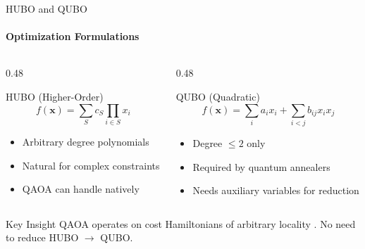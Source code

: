 \documentclass[aspectratio=169, t]{beamer}
\begin{document}
\begin{frame}{HUBO and QUBO}
\framesubtitle{Optimization Formulations}

\begin{columns}
\begin{column}{0.48\textwidth}
\begin{block}{HUBO (Higher-Order)}
$$f(\mathbf{x}) = \sum_{S} c_S \prod_{i \in S} x_i$$
\begin{itemize}
    \item Arbitrary degree polynomials
    \item Natural for complex constraints
    \item QAOA can handle natively
\end{itemize}
\end{block}
\end{column}

\begin{column}{0.48\textwidth}
\begin{block}{QUBO (Quadratic)}
$$f(\mathbf{x}) = \sum_i a_i x_i + \sum_{i<j} b_{ij} x_i x_j$$
\begin{itemize}
    \item Degree $\leq 2$ only
    \item Required by quantum annealers
    \item Needs auxiliary variables for reduction
\end{itemize}
\end{block}
\end{column}
\end{columns}

\bigskip
\begin{exampleblock}{Key Insight}
QAOA operates on cost Hamiltonians of arbitrary locality \cite{hadfield2019qaoa}. No need to reduce HUBO $\rightarrow$ QUBO.
\end{exampleblock}
\end{frame}
\end{document}
